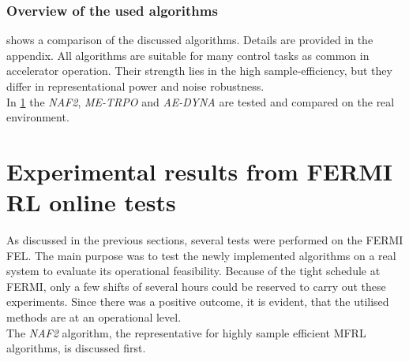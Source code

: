 \documentclass[
reprint,
amsmath,amssymb,amsfonts,clevref,
aps,
prstab,
]{revtex4-2}
\begin{document}
	\subsubsection{Overview of the used algorithms}
	 shows a comparison of the discussed algorithms. Details are provided in the appendix. All algorithms are suitable for many control tasks as common in accelerator operation. Their strength lies in the high sample-efficiency, but they differ in representational power and noise robustness. \\
	In \cref{sec:Experimental results from FERMI RL online tests} the \emph{NAF2},
	\emph{ME-TRPO} and \emph{AE-DYNA} are tested and compared on the real environment.
\begin{table}[b]%
	\caption{\label{tab:overview_algorithms}%
		Overview of the algorithms.
	}
\end{table}


	\section{Experimental results from FERMI RL online tests}\label{sec:Experimental results from FERMI RL online tests}
	As discussed in the previous sections, several tests were performed on the FERMI FEL.
	The main purpose was to test the newly implemented algorithms on a real system to evaluate its operational feasibility. 
	Because of the tight schedule at FERMI, only a few shifts of several hours could be reserved to carry out these experiments. Since there was a positive outcome, it is evident, that the utilised methods are at an operational level.\\
	The \emph{NAF2} algorithm, the representative for highly sample efficient MFRL algorithms, is discussed first.
\end{document}
